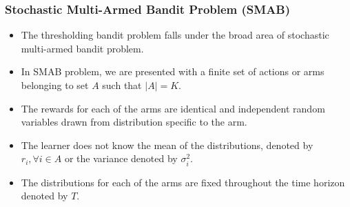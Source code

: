\begin{frame}
\frametitle{Stochastic Multi-Armed Bandit Problem (SMAB)}
\begin{itemize}
\item<1-> The thresholding bandit problem falls under the broad area of stochastic multi-armed bandit problem.
\item<2-> In SMAB problem, we are presented with a finite set of actions or arms belonging to set $A$ such that $|A|=K$. 
\item<3-> The rewards for each of the arms are identical and independent random variables drawn from distribution specific to the arm.
\item<4-> The learner does not know the mean of the distributions, denoted by $r_{i},\forall i\in A$ or  the variance denoted by $\sigma_i^2$. 
\item<5-> The distributions for each of the arms are fixed throughout the time horizon denoted by $T$. 
\end{itemize}
\end{frame}


